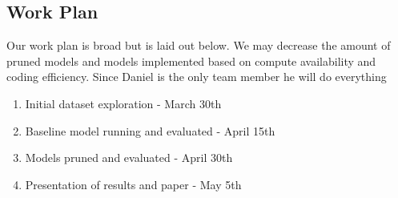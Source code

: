 \documentclass[sigplan,screen]{acmart}
\begin{document}
\subsection{Work Plan}
Our work plan is broad but is laid out below. We may decrease the amount of pruned models and models implemented based on compute availability and coding efficiency. Since Daniel is the only team member he will do everything 
\begin{enumerate}
    \item Initial dataset exploration - March 30th
    \item Baseline model running and evaluated - April 15th
    \item Models pruned and evaluated - April 30th
    \item Presentation of results and paper - May 5th
\end{enumerate}


\end{document}
